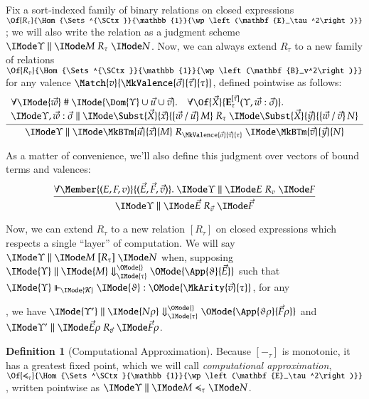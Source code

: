 \documentclass[11pt]{article}
\theoremstyle{definition}
\newtheorem{definition}[thm]{Definition}
\theoremstyle{remark}
\numberwithin{equation}{section}
\newcommand\Pow[1]{\wp\left(#1\right)}
\newcommand\CanOperators{\mathcal{K}}
\newcommand\RenameLit[3]{%
  \left\{#1\, /\, #2\right\}#3%
}
\newcommand\EvalN[5]{\IMode{#1}\parallel\IMode{#4}\Downarrow^{\OMode{#3}}_{\IMode{#2}}\OMode{#5}}
\newcommand\Eval[4]{\EvalN{#1}{#2}{}{#3}{#4}}
\newcommand\Exprs{\mathbf{E}}
\newcommand\BTms{\mathbf{B}}
\begin{document}
Fix a sort-indexed family of binary relations on closed expressions
$\Of{R_\tau}{\Hom{\Sets^{\SCtx}}{\mathbb{1}}{\Pow{\Exprs_\tau^2}}}$; we will
also write the relation as a judgment scheme
$\SBinRel{R_\tau}{\Upsilon}{M}{N}$. Now, we can always extend $R_\tau$ to a new
family of relations
$\Of{R_v}{\Hom{\Sets^{\SCtx}}{\mathbb{1}}{\Pow{\BTms_v^2}}}$ for any valence
$\Match{v}{\MkValence{\vec{\sigma}}{\vec{\tau}}{\tau}}$, defined pointwise as
follows:
\[
  \infer{
    \SBinRel{R_{\MkValence{\vec{\sigma}}{\vec{\tau}}{\tau}}}{\Upsilon}{
      \MkBTm{\vec{u}}{\vec{x}}{M}
    }{
      \MkBTm{\vec{v}}{\vec{y}}{N}
    }
  }{
    \begin{array}{l}
      \forall\IMode{\vec{w}}\mathrel{\#}\IMode{\Dom{\Upsilon}\cup\vec{u}\cup\vec{v}}.\quad
      \forall\Of{\vec{X}}{\Exprs_\tau^{[\vec{\tau}]}(\Upsilon,\vec{w}:\vec{\sigma})}.\\
      \SBinRel{R_\tau}{\Upsilon,\vec{w}:\vec{\sigma}}{
        \Subst{\vec{X}}{\vec{x}}{\RenameLit{\vec{w}}{\vec{u}}{M}}
      }{
        \Subst{\vec{X}}{\vec{y}}{\RenameLit{\vec{w}}{\vec{v}}{N}}
      }
    \end{array}
  }
\]

As a matter of convenience, we'll also define this judgment over vectors of bound terms and valences:
\[
  \infer{
    \SBinRel{R_{\vec{v}}}{\Upsilon}{\vec{E}}{\vec{F}}
  }{
    \forall\Member{(E,F,v)}{(\vec{E},\vec{F},\vec{v})}.\
    \SBinRel{R_v}{\Upsilon}{E}{F}
  }
\]

Now, we can extend $R_\tau$ to a new relation $[R_\tau]$ on closed expressions
which respects a single ``layer'' of computation. We will say
$\SBinRel{[R_\tau]}{\Upsilon}{M}{N}$ when, supposing
$\Eval{\Upsilon}{\tau}{M}{\App{\vartheta}{\Vec{E}}}$ such that
$\IMode{\Upsilon}\Vdash_{\IMode{\CanOperators}}\IMode{\vartheta}:\OMode{\MkArity{\vec{v}}{\tau}}$,
for any
,
we have $\Eval{\Upsilon'}{\tau}{N\rho}{\App{\vartheta\rho}{\Vec{F}\rho}}$ and
$\SBinRel{R_{\vec{v}}}{\Upsilon'}{\vec{E}\rho}{\vec{F}\rho}$.

\begin{definition}[Computational Approximation]
Because $[-_\tau]$ is monotonic, it has a greatest fixed point, which we will
call \emph{computational approximation},
$\Of{\preccurlyeq_\tau}{\Hom{\Sets^\SCtx}{\mathbb{1}}{\Pow{\Exprs_\tau^2}}}$,
written pointwise as $\SBinRel{\preccurlyeq_\tau}{\Upsilon}{M}{N}$.
\end{definition}
\end{document}
